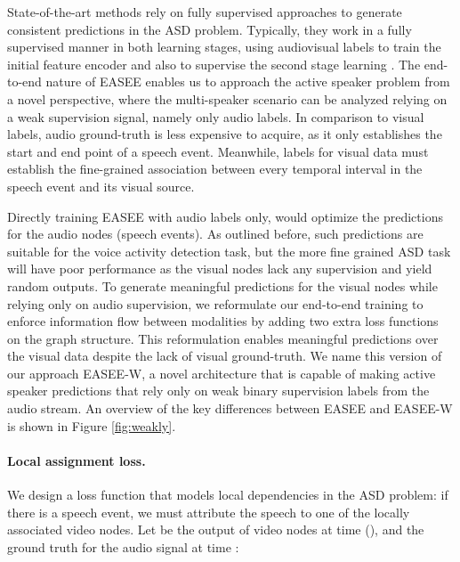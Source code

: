 \documentclass[10pt,twocolumn,letterpaper]{article}
\begin{document}
\label{sec:weakly}
State-of-the-art methods rely on fully supervised approaches to generate consistent predictions in the ASD problem. Typically, they work in a fully supervised manner in both learning stages, using audiovisual labels to train the initial feature encoder and also to supervise the second stage learning \cite{kopuklu2021design,tao2021someone,alcazar2020active,leon2021maas}. The end-to-end nature of EASEE enables us to approach the active speaker problem from a novel perspective, where the multi-speaker scenario can be analyzed relying on a weak supervision signal, namely only audio labels. In comparison to visual labels, audio ground-truth is less expensive to acquire, as it only establishes the start and end point of a speech event. Meanwhile, labels for visual data must establish the fine-grained association between every temporal interval in the speech event and its visual source. 

Directly training EASEE with audio labels only, would optimize the predictions for the audio nodes (speech events). As outlined before, such predictions are suitable for the voice activity detection task, but the more fine grained ASD task will have poor performance as the visual nodes lack any supervision and yield random outputs. To generate meaningful predictions for the visual nodes while relying only on audio supervision, we reformulate our end-to-end training to enforce information flow between modalities by adding two extra loss functions on the graph structure. This reformulation enables meaningful predictions over the visual data despite the lack of visual ground-truth. We name this version of our approach EASEE-W, a novel architecture that is capable of making active speaker predictions that rely only on weak binary supervision labels from the audio stream. An overview of the key differences between EASEE and EASEE-W is shown in Figure \ref{fig:weakly}.

\paragraph{Local assignment loss.} We design a loss function that models local dependencies in the ASD problem: if there is a speech event, we must attribute the speech to one of the locally associated video nodes. Let  be the output of video nodes at time  (), and  the ground truth for the audio signal at time :
\end{document}
